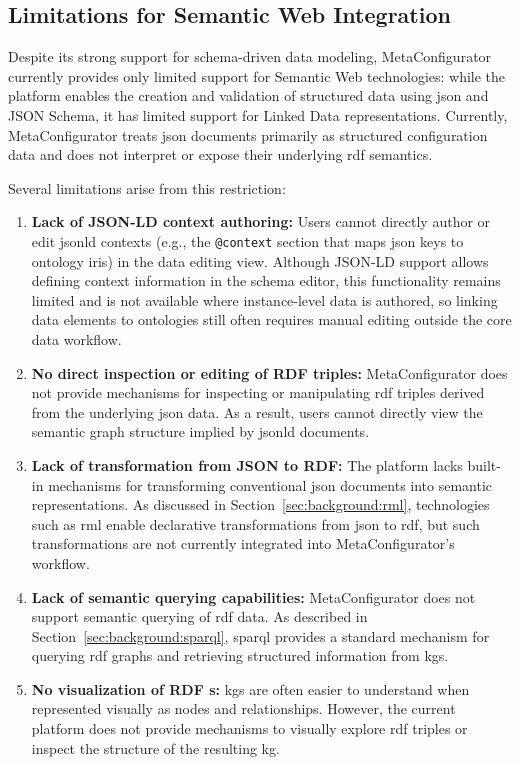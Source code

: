 \newpage

\subsection{Limitations for Semantic Web Integration}
\label{sec:background:metaconfigurator_limitations}

Despite its strong support for schema-driven data modeling, MetaConfigurator currently provides only limited support for Semantic Web technologies: while the platform enables the creation and validation of structured data using \gls{json} and JSON Schema, it has limited support for Linked Data representations. Currently, MetaConfigurator treats \gls{json} documents primarily as structured configuration data and does not interpret or expose their underlying \gls{rdf} semantics.

Several limitations arise from this restriction:

\begin{enumerate}
    \item \textbf{Lack of JSON-LD context authoring:}  
    Users cannot directly author or edit \gls{jsonld} contexts (e.g., the \texttt{@context} section that maps \gls{json} keys to ontology \glspl{iri}) in the data editing view. Although JSON-LD support allows defining context information in the schema editor, this functionality remains limited and is not available where instance-level data is authored, so linking data elements to ontologies still often requires manual editing outside the core data workflow.

    \item \textbf{No direct inspection or editing of RDF triples:}  
    MetaConfigurator does not provide mechanisms for inspecting or manipulating \gls{rdf} triples derived from the underlying \gls{json} data. As a result, users cannot directly view the semantic graph structure implied by \gls{jsonld} documents.

    \item \textbf{Lack of transformation from JSON to RDF:}  
    The platform lacks built-in mechanisms for transforming conventional \gls{json} documents into semantic representations. As discussed in Section~\ref{sec:background:rml}, technologies such as \gls{rml} enable declarative transformations from \gls{json} to \gls{rdf}, but such transformations are not currently integrated into MetaConfigurator's workflow.

    \item \textbf{Lack of semantic querying capabilities:}  
    MetaConfigurator does not support semantic querying of \gls{rdf} data. As described in Section~\ref{sec:background:sparql}, \gls{sparql} provides a standard mechanism for querying \gls{rdf} graphs and retrieving structured information from \glspl{kg}.

    \item \textbf{No visualization of RDF s:}  
    \Glspl{kg} are often easier to understand when represented visually as nodes and relationships. However, the current platform does not provide mechanisms to visually explore \gls{rdf} triples or inspect the structure of the resulting \gls{kg}.
\end{enumerate}

